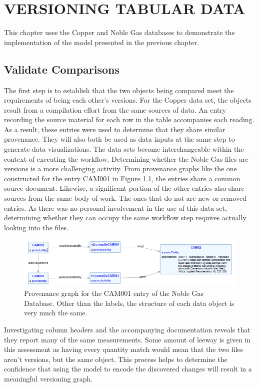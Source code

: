 
\chapter{VERSIONING TABULAR DATA}\label{ch:implement}

This chapter uses the Copper and Noble Gas databases to demonstrate the implementation of the model presented in the previous chapter.

\section{Validate Comparisons}

The first step is to establish that the two objects being compared meet the requirements of being each other's versions.
For the Copper data set, the objects result from a compilation effort from the same sources of data.
An entry recording the source material for each row in the table accompanies each reading.
As a result, these entries were used to determine that they share similar provenance.
They will also both be used as data inputs at the same step to generate data visualizations.
The data sets become interchangeable within the context of executing the workflow.
Determining whether the Noble Gas files are versions is a more challenging activity.
From provenance graphs like the one constructed for the entry CAM001 in Figure \ref{CAM001ProvGraph}, the entries share a common source document.
Likewise, a significant portion of the other entries also share sources from the same body of work.
The ones that do not are new or removed entries.
As there was no personal involvement in the use of this data set, determining whether they can occupy the same workflow step requires actually looking into the files.
\begin{figure}
	\centering
	\includegraphics[scale=0.70]{figures/CAM001v1v2.png}
	\caption{Provenance graph for the CAM001 entry of the Noble Gas Database.  Other than the labels, the structure of each data object is very much the same.}
	\label{CAM001ProvGraph}
\end{figure}
Investigating column headers and the accompanying documentation reveals that they report many of the same measurements.
Some amount of leeway is given in this assessment as having every quantity match would mean that the two files aren't versions, but the same object.
This process helps to determine the confidence that using the model to encode the discovered changes will result in a meaningful versioning graph.


